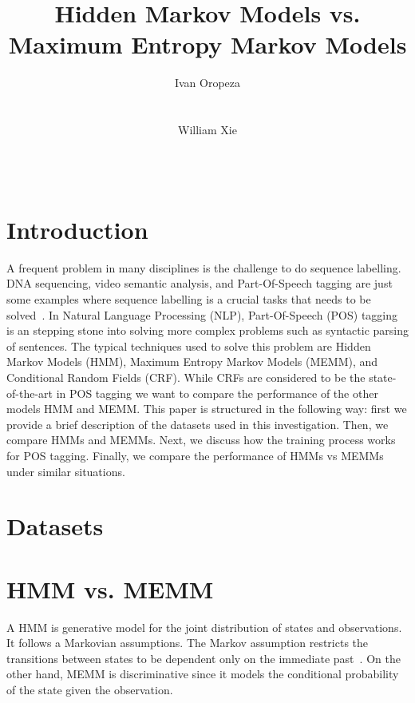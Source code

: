 \documentclass{acm_proc_article-sp}
\begin{document}
\author{
\alignauthor
Ivan Oropeza\\
       \\
       \\
\alignauthor
William Xie\\
       \\
       \\
}

\title{Hidden Markov Models vs. Maximum Entropy Markov Models}


\maketitle
\section{Introduction}
A frequent problem in many disciplines is the challenge to do sequence labelling. DNA sequencing, video semantic analysis, and Part-Of-Speech tagging are just some examples where sequence labelling is a crucial tasks that needs to be solved~\cite{dnaEx, videoEx, nlpEx}. In Natural Language Processing (NLP), Part-Of-Speech (POS) tagging is an stepping stone into solving more complex problems such as syntactic parsing of sentences. The typical techniques used to solve this problem are Hidden Markov Models (HMM), Maximum Entropy Markov Models (MEMM), and Conditional Random Fields (CRF). While CRFs are considered to be the state-of-the-art in POS tagging we want to compare the performance of the other models HMM and MEMM. This paper is structured in the following way: first we provide a brief description of the datasets used in this investigation. Then, we compare HMMs and MEMMs. Next, we discuss how the training process works for POS tagging. Finally, we compare the performance of HMMs vs MEMMs under similar situations.
\section{Datasets}

\section{HMM vs. MEMM}
A HMM is generative model for the joint distribution of states and observations. It follows a Markovian assumptions. The Markov assumption restricts the transitions between states to be dependent only on the immediate past~\cite{nlpBook}. On the other hand, MEMM is discriminative since it models the conditional probability of the state given the observation. 
\end{document}
